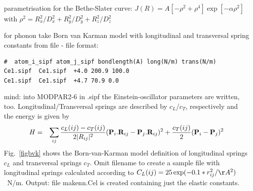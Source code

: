 \begin{description}
\begin{description}
parametrisation for the Bethe-Slater
                               curve: $J(R)= A [-\rho^2+\rho^4]\exp[-\alpha \rho^2]$  with %
$\rho^2=R_x^2/D_x^2+R_y^2/D_y^2+R_z^2/D_z^2$
\item[option {\prg option -bvk filename}]
              for phonon take Born van Karman model with longitudinal and
              transversal spring constants from file - file format:
             \begin{verbatim}#  atom_i_sipf atom_j_sipf bondlength(A) long(N/m) trans(N/m) 
Ce1.sipf  Ce1.sipf  +4.0 200.9 100.0
Ce1.sipf  Ce1.sipf  +4.7 70.9 0.0
             \end{verbatim}
              mind: into MODPAR2-6 in {\prg *.sipf} the Einstein-oscillator parameters
              are written, too.
              Longitudinal/Transversal springs are described by $c_L$/$c_T$, respectively and
              the energy is given by
\begin{eqnarray}
 H &=& \sum_{ij} \frac{c_L(ij)-c_T(ij)}{2|\mbf \mbf R_{ij}|^2} (\mbf P_i . \mbf R_{ij}- \mbf P_j . \mbf R_{ij})^2 
       + \frac{c_T(ij)}{2} (\mbf P_i - \mbf P_j )^2 
\end{eqnarray}
Fig.~\ref{figbvk} shows the Born-van-Karman
model definition of longitudinal springs $c_L$ and transversal
springs $c_T$.
               Omit filename to create a sample file with
              longitudinal springs calculated according to $C_L(ij)=25 \exp(-0.1*r^2_{ij}/\AA^2)$~N/m.
	      Output: file {\prg makenn.Cel} is created containing just the elastic constants.


\end{description}
\end{description}
